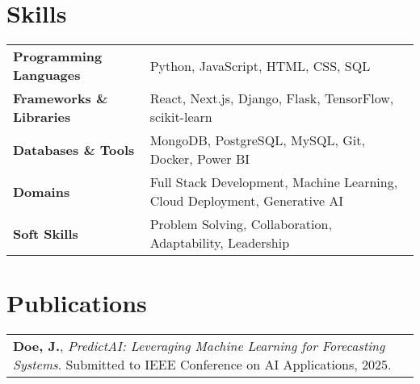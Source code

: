 \documentclass[a4paper,12pt]{article}
\begin{document}
\section{Skills}
\begin{tabularx}{\linewidth}{@{}l X@{}}
\textbf{Programming Languages} & Python, JavaScript, HTML, CSS, SQL \\
\textbf{Frameworks \& Libraries} & React, Next.js, Django, Flask, TensorFlow, scikit-learn \\
\textbf{Databases \& Tools} & MongoDB, PostgreSQL, MySQL, Git, Docker, Power BI \\
\textbf{Domains} & Full Stack Development, Machine Learning, Cloud Deployment, Generative AI \\
\textbf{Soft Skills} & Problem Solving, Collaboration, Adaptability, Leadership \\
\end{tabularx}

\section{Publications}
\begin{tabularx}{\linewidth}{@{}l X@{}}
\textbf{Doe, J.}, \textit{PredictAI: Leveraging Machine Learning for Forecasting Systems}. Submitted to IEEE Conference on AI Applications, 2025.
\end{tabularx}

\vfill
{}
\end{document}
